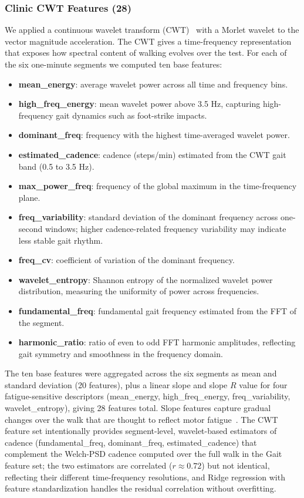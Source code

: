 \documentclass{article}
\begin{document}
\subsubsection{Clinic CWT Features (28)}
We applied a continuous wavelet transform (CWT)~\cite{torrence1998practical} with a Morlet wavelet to the vector magnitude acceleration. The CWT gives a time-frequency representation that exposes how spectral content of walking evolves over the test. For each of the six one-minute segments we computed ten base features:
\begin{itemize}
    \item \textbf{mean\_energy}: average wavelet power across all time and frequency bins.
    \item \textbf{high\_freq\_energy}: mean wavelet power above 3.5 Hz, capturing high-frequency gait dynamics such as foot-strike impacts.
    \item \textbf{dominant\_freq}: frequency with the highest time-averaged wavelet power.
    \item \textbf{estimated\_cadence}: cadence (steps/min) estimated from the CWT gait band (0.5 to 3.5 Hz).
    \item \textbf{max\_power\_freq}: frequency of the global maximum in the time-frequency plane.
    \item \textbf{freq\_variability}: standard deviation of the dominant frequency across one-second windows; higher cadence-related frequency variability may indicate less stable gait rhythm.
    \item \textbf{freq\_cv}: coefficient of variation of the dominant frequency.
    \item \textbf{wavelet\_entropy}: Shannon entropy of the normalized wavelet power distribution, measuring the uniformity of power across frequencies.
    \item \textbf{fundamental\_freq}: fundamental gait frequency estimated from the FFT of the segment.
    \item \textbf{harmonic\_ratio}: ratio of even to odd FFT harmonic amplitudes, reflecting gait symmetry and smoothness in the frequency domain.
\end{itemize}
The ten base features were aggregated across the six segments as mean and standard deviation (20 features), plus a linear slope and slope $R$ value for four fatigue-sensitive descriptors (mean\_energy, high\_freq\_energy, freq\_variability, wavelet\_entropy), giving 28 features total. Slope features capture gradual changes over the walk that are thought to reflect motor fatigue~\cite{qureshi2016relationship}. The CWT feature set intentionally provides segment-level, wavelet-based estimators of cadence (fundamental\_freq, dominant\_freq, estimated\_cadence) that complement the Welch-PSD cadence computed over the full walk in the Gait feature set; the two estimators are correlated ($r \approx 0.72$) but not identical, reflecting their different time-frequency resolutions, and Ridge regression with feature standardization handles the residual correlation without overfitting.
\end{document}
